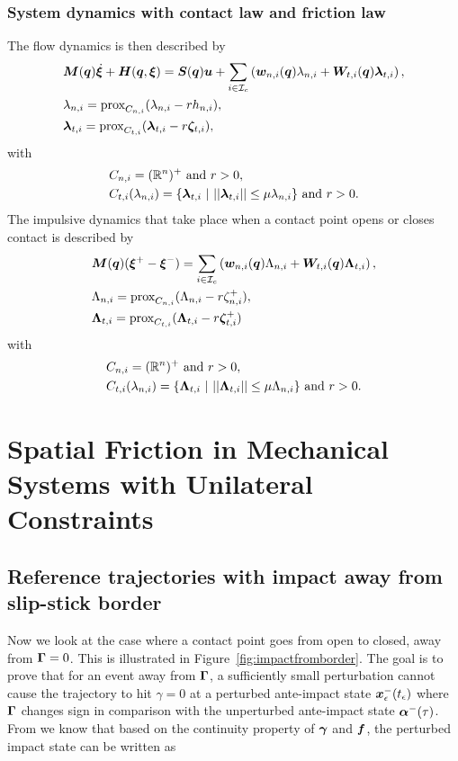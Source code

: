 \documentclass[../DC2017114Bouma.tex]{subfiles}
\begin{document}
\subsection{System dynamics with contact law and friction law}
The flow dynamics is then described by
\begin{align}
&{\boldsymbol{M}}({\boldsymbol{q}})\dot{\boldsymbol{\xi}} + {\boldsymbol{H}}({\boldsymbol{q}},\boldsymbol{\xi}) = {\boldsymbol{S}}({\boldsymbol{q}}){\boldsymbol{u}} + \sum_{i\in\mathcal{I}_c}\left({\boldsymbol{w}}_{n,i}({\boldsymbol{q}})\lambda_{n,i} + {\boldsymbol{W}}_{t,i}({\boldsymbol{q}})\boldsymbol{\lambda}_{t,i} \right), \label{eq:proxcontact1}\\
&\lambda_{n,i} = \operatorname{\text{prox}}_{C_{n,i}}(\lambda_{n,i} - rh_{n,i}),\label{eq:proxcontact2}\\
&\boldsymbol{\lambda}_{t,i} = \operatorname{\text{prox}}_{C_{t,i}}(\boldsymbol{\lambda}_{t,i} - r\boldsymbol{\zeta}_{t,i}),\label{eq:proxcontact3}
\end{align}
with
\begin{align}
&C_{n,i} = (\mathbb{R}^n)^+\text{ and } r>0,\\
&C_{t,i}(\lambda_{n,i}) = \{\boldsymbol{\lambda}_{t,i}\ |\ ||\boldsymbol{\lambda}_{t,i}|| \leq \mu\lambda_{n,i}\}\text{ and }r>0.
\end{align}
The impulsive dynamics that take place when a contact point opens or closes contact is described by
\begin{align}
&{\boldsymbol{M}}({\boldsymbol{q}})(\boldsymbol{\xi}^+ - \boldsymbol{\xi}^-) = \sum_{i\in\mathcal{I}_c}\left( {\boldsymbol{w}}_{n,i}({\boldsymbol{q}})\Lambda_{n,i} + {\boldsymbol{W}}_{t,i}({\boldsymbol{q}})\boldsymbol{\Lambda}_{t,i}\right), \label{eq:proximpact1}\\
&\Lambda_{n,i} = \operatorname{\text{prox}}_{C_{n,i}}(\Lambda_{n,i} - r\zeta^+_{n,i}),\label{eq:proximpact2}\\
&\boldsymbol{\Lambda}_{t,i} = \operatorname{\text{prox}}_{C_{t,i}}(\boldsymbol{\Lambda}_{t,i} - r\boldsymbol{\zeta}^+_{t,i})\,\label{eq:proximpact3}
\end{align}
with
\begin{align}
&C_{n,i} = (\mathbb{R}^n)^+\text{ and } r>0,\\
&C_{t,i}(\lambda_{n,i}) = \{\boldsymbol{\Lambda}_{t,i}\ |\ ||\boldsymbol{\Lambda}_{t,i}|| \leq \mu\Lambda_{n,i}\}\text{ and }r>0.
\end{align}

\pagestyle{fancyreport}
\cleartooddpage
\pagestyle{fancyreport}
\chapter{Spatial Friction in Mechanical Systems with Unilateral Constraints}
\section{Reference trajectories with impact away from slip-stick border}\label{app:impactsaway}
Now we look at the case where a contact point goes from open to closed, away from $\boldsymbol{\Gamma} = 0$. This is illustrated in Figure~\ref{fig:impactfromborder}. The goal is to prove that for an event away from $\boldsymbol{\Gamma}$, a sufficiently small perturbation cannot cause the trajectory to hit $\gamma = 0$ at a perturbed ante-impact state ${\boldsymbol{x}}_\epsilon^-(t_\epsilon)$ where $\boldsymbol{\Gamma}$ changes sign in comparison with the unperturbed ante-impact state $\boldsymbol{\alpha}^-(\tau)$. From \cite[p. 6]{Rijnen2018} we know that based on the continuity property of $\boldsymbol{\gamma}$ and ${\boldsymbol{f}}$, the perturbed impact state can be written as
\end{document}
